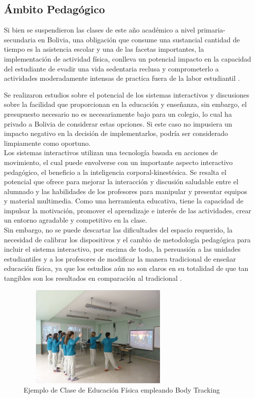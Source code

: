 \subsection{Ámbito Pedagógico}

Si bien se suspendieron las clases de este año académico a nivel primaria-secundaria en Bolivia, una obligación que consume una sustancial cantidad de tiempo es la asistencia escolar y una de las facetas importantes, la implementación de actividad física, conlleva un potencial impacto en la capacidad del estudiante de evadir una vida sedentaria reclusa y comprometerlo a actividades moderadamente intensas de practica fuera de la labor estudiantil \cite{daly2018systematic}.

Se realizaron estudios sobre el potencial de los sistemas interactivos y discusiones sobre la facilidad que proporcionan en la educación y enseñanza, sin embargo, el presupuesto necesario no es necesariamente bajo para un colegio, lo cual ha privado a Bolivia de considerar estas opciones. Si este caso no impusiera un impacto negativo en la decisión de implementarlos, podría ser considerado limpiamente como oportuno.\\

Los sistemas interactivos utilizan una tecnología basada en acciones de movimiento, el cual puede envolverse con un importante aspecto interactivo pedagógico, el beneficio a la inteligencia corporal-kinestésica. Se resalta el potencial que ofrece para mejorar la interacción y discusión saludable entre el alumnado y las habilidades de los profesores para manipular y presentar equipos y material multimedia. Como una herramienta educativa, tiene la capacidad de impulsar la motivación, promover el aprendizaje e interés de las actividades, crear un entorno agradable y competitivo en la clase\cite{pirie1995meaning}.\\

Sin embargo, no se puede descartar las dificultades del espacio requerido, la necesidad de calibrar los dispositivos y el cambio de metodología pedagógica para incluir el sistema interactivo, por encima de todo, la persuasión a las unidades estudiantiles y a los profesores de modificar la manera tradicional de enseñar educación física, ya que los estudios aún no son claros en su totalidad de que tan tangibles son los resultados en comparación al tradicional \cite{daly2018systematic}. \\
\begin{figure}[t!]
	\centering
	\includegraphics[width=8cm,height=5cm,]{./Images/kinectexampleschool.jpg}
	\caption{Ejemplo de Clase de Educación Física empleando Body Tracking}
	\label{claseEF}
\end{figure}


